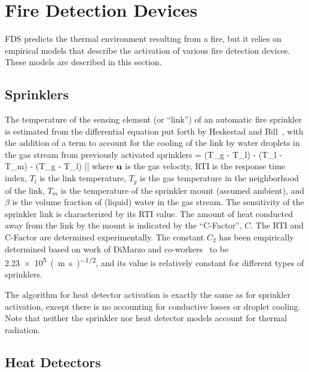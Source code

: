 

\chapter{Fire Detection Devices}

FDS predicts the thermal environment resulting from a fire, but it relies on empirical models that describe the activation of various fire detection devices. These models are described in this section.


\section{Sprinklers}

The temperature of the sensing element (or ``link'') of an automatic fire sprinkler is estimated from the differential equation put forth by Heskestad and Bill~\cite{Heskestad:3}, with the addition of a term to account for the cooling of the link by water droplets in the gas stream from previously activated sprinklers
\be {} =  (T_g - T_l) -
    (T_l - T_m) -  (T_g - T_l) \beta |\bu|
   \label{actode}
\ee
where ${\mathbf{u}}$ is the gas velocity, RTI is the response time index, $T_l$ is the link temperature, $T_g$ is the gas temperature in the neighborhood of the link, $T_m$ is the temperature of the sprinkler mount (assumed ambient), and $\beta$ is the volume fraction of (liquid) water in the gas stream. The sensitivity of the sprinkler link is characterized by its RTI value. The amount of heat conducted away from the link by the mount is indicated by the ``C-Factor'', $C$. The RTI and C-Factor are determined experimentally. The constant $C_2$ has been empirically determined based on work of DiMarzo and co-workers~\cite{Ruffino:1,Ruffino:2,Gavelli:1} to be \SI{2.23e5}{(m s)^{-1/2}}, and its value is relatively constant for different types of sprinklers.

The algorithm for heat detector activation is exactly the same as for sprinkler activation, except there is no accounting for conductive losses or droplet cooling. Note that neither the sprinkler nor heat detector models account for thermal radiation.

\section{Heat Detectors}


